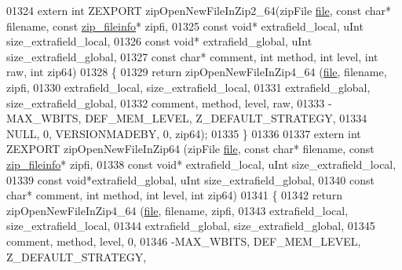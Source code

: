 \begin{DoxyCode}
01324 \textcolor{keyword}{extern} \textcolor{keywordtype}{int} ZEXPORT zipOpenNewFileInZip2\_64(zipFile \hyperlink{structfile}{file}, \textcolor{keyword}{const} \textcolor{keywordtype}{char}* filename, \textcolor{keyword}{const} 
      \hyperlink{structzip__fileinfo}{zip\_fileinfo}* zipfi,
01325                                         \textcolor{keyword}{const} \textcolor{keywordtype}{void}* extrafield\_local, uInt size\_extrafield\_local,
01326                                         \textcolor{keyword}{const} \textcolor{keywordtype}{void}* extrafield\_global, uInt size\_extrafield\_global,
01327                                         \textcolor{keyword}{const} \textcolor{keywordtype}{char}* comment, \textcolor{keywordtype}{int} method, \textcolor{keywordtype}{int} level, \textcolor{keywordtype}{int} raw, \textcolor{keywordtype}{int} zip64)
01328 \{
01329     \textcolor{keywordflow}{return} zipOpenNewFileInZip4\_64 (\hyperlink{structfile}{file}, filename, zipfi,
01330                                  extrafield\_local, size\_extrafield\_local,
01331                                  extrafield\_global, size\_extrafield\_global,
01332                                  comment, method, level, raw,
01333                                  -MAX\_WBITS, DEF\_MEM\_LEVEL, Z\_DEFAULT\_STRATEGY,
01334                                  NULL, 0, VERSIONMADEBY, 0, zip64);
01335 \}
01336 
01337 \textcolor{keyword}{extern} \textcolor{keywordtype}{int} ZEXPORT zipOpenNewFileInZip64 (zipFile \hyperlink{structfile}{file}, \textcolor{keyword}{const} \textcolor{keywordtype}{char}* filename, \textcolor{keyword}{const} 
      \hyperlink{structzip__fileinfo}{zip\_fileinfo}* zipfi,
01338                                         \textcolor{keyword}{const} \textcolor{keywordtype}{void}* extrafield\_local, uInt size\_extrafield\_local,
01339                                         \textcolor{keyword}{const} \textcolor{keywordtype}{void}*extrafield\_global, uInt size\_extrafield\_global,
01340                                         \textcolor{keyword}{const} \textcolor{keywordtype}{char}* comment, \textcolor{keywordtype}{int} method, \textcolor{keywordtype}{int} level, \textcolor{keywordtype}{int} zip64)
01341 \{
01342     \textcolor{keywordflow}{return} zipOpenNewFileInZip4\_64 (\hyperlink{structfile}{file}, filename, zipfi,
01343                                  extrafield\_local, size\_extrafield\_local,
01344                                  extrafield\_global, size\_extrafield\_global,
01345                                  comment, method, level, 0,
01346                                  -MAX\_WBITS, DEF\_MEM\_LEVEL, Z\_DEFAULT\_STRATEGY,

\end{DoxyCode}
